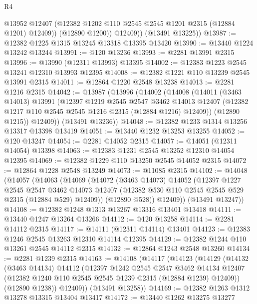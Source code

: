 \begin{lexlean}{R4}
\begin{coremodule}
              @13952
              @12407
              (@12382 @1202 @110 @2545 @2545 @1201 @2315 (@12884 @1201) @12409))
            (@12890 @1200))
          @12409))
      (@13491 @13225))
@13987 := @12382 @1225 @1315 @13245 @13318 @13395 @13420
@13990 := @13440 @1224 @13242 @13244
@13991 := @120 @13236
@13993 := @2281 @13991 @2315
@13996 := @13990 (@12311 @13993) @13395
@14002 := @12383 @1223 @2545 @13241 @12310 @13993 @12395
@14008 := @12382 @1221 @110 @13239 @2545 @13991 @2315
@14011 := @12864 @1220 @2548 @13238
@14013 := @2281 @1216 @2315
@14042 := @13987
    (@13996
      (@14002
        (@14008
          (@14011
            (@3463 @14013)
            @13991
            (@12397
              @1219
              @2545
              @2547
              @3462
              @14013
              @12407
              (@12382 @1217 @110 @2545 @2545 @1216 @2315 (@12884 @1216) @12409))
            (@12890 @1215))
          @12409))
      (@13491 @13236))
@14048 := @12382 @1233 @1314 @13256 @13317 @13398 @13419
@14051 := @13440 @1232 @13253 @13255
@14052 := @120 @13247
@14054 := @2281 @14052 @2315
@14057 := @14051 (@12311 @14054) @13398
@14063 := @12383 @1231 @2545 @13252 @12310 @14054 @12395
@14069 := @12382 @1229 @110 @13250 @2545 @14052 @2315
@14072 := @12864 @1228 @2548 @13249
@14073 := @11085 @2315
@14102 := @14048
    (@14057
      (@14063
        (@14069
          (@14072
            (@3463 @14073)
            @14052
            (@12397
              @1227
              @2545
              @2547
              @3462
              @14073
              @12407
              (@12382 @530 @110 @2545 @2545 @529 @2315 (@12884 @529) @12409))
            (@12890 @528))
          @12409))
      (@13491 @13247))
@14108 := @12382 @1248 @1313 @13267 @13316 @13401 @13418
@14111 := @13440 @1247 @13264 @13266
@14112 := @120 @13258
@14114 := @2281 @14112 @2315
@14117 := @14111 (@12311 @14114) @13401
@14123 := @12383 @1246 @2545 @13263 @12310 @14114 @12395
@14129 := @12382 @1244 @110 @13261 @2545 @14112 @2315
@14132 := @12864 @1243 @2548 @13260
@14134 := @2281 @1239 @2315
@14163 := @14108
    (@14117
      (@14123
        (@14129
          (@14132
            (@3463 @14134)
            @14112
            (@12397
              @1242
              @2545
              @2547
              @3462
              @14134
              @12407
              (@12382 @1240 @110 @2545 @2545 @1239 @2315 (@12884 @1239) @12409))
            (@12890 @1238))
          @12409))
      (@13491 @13258))
@14169 := @12382 @1263 @1312 @13278 @13315 @13404 @13417
@14172 := @13440 @1262 @13275 @13277

\end{coremodule}
\end{lexlean}
